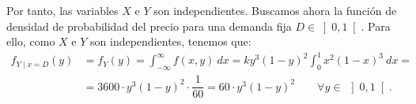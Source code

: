 \begin{ejercicio}
    Por tanto, las variables $X$ e $Y$ son independientes. Buscamos ahora la función de densidad de probabilidad del precio para una demanda fija $D\in \left]0,1\right[$. Para ello, como $X$ e $Y$ son independientes, tenemos que:
    \begin{align*}
        f_{Y\mid x=D}(y) &= f_Y(y) = \int_{-\infty}^{\infty} f(x,y) ~d{x} = ky^3(1-y)^2\int_{0}^{1}x^2(1-x)^3 ~d{x} =\\&= 3600\cdot y^3(1-y)^2 \cdot \dfrac{1}{60} = 60\cdot y^3(1-y)^2
        \qquad \forall y\in~\left]0,1\right[.
    \end{align*}
\end{ejercicio}